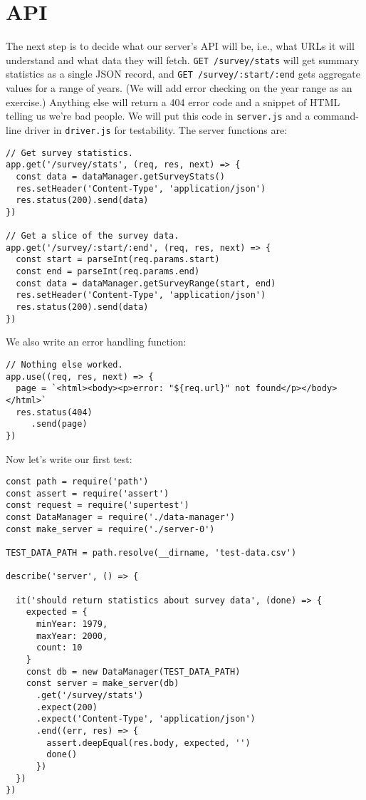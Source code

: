 \section{API}\label{s:capstone-api}

The next step is to decide what our server's API will be,
i.e.,
what URLs it will understand and what data they will fetch.
\texttt{GET\ /survey/stats} will get summary statistics as a single JSON record,
and \texttt{GET\ /survey/:start/:end} gets aggregate values for a range of years.
(We will add error checking on the year range as an exercise.)
Anything else will return a 404 error code and a snippet of HTML telling us we're bad people.
We will put this code in \texttt{server.js} and a command-line driver in \texttt{driver.js} for testability.
The server functions are:

\begin{verbatim}
// Get survey statistics.
app.get('/survey/stats', (req, res, next) => {
  const data = dataManager.getSurveyStats()
  res.setHeader('Content-Type', 'application/json')
  res.status(200).send(data)
})

// Get a slice of the survey data.
app.get('/survey/:start/:end', (req, res, next) => {
  const start = parseInt(req.params.start)
  const end = parseInt(req.params.end)
  const data = dataManager.getSurveyRange(start, end)
  res.setHeader('Content-Type', 'application/json')
  res.status(200).send(data)
})
\end{verbatim}

\noindent
We also write an error handling function:

\begin{verbatim}
// Nothing else worked.
app.use((req, res, next) => {
  page = `<html><body><p>error: "${req.url}" not found</p></body></html>`
  res.status(404)
     .send(page)
})
\end{verbatim}

Now let's write our first test:

\begin{verbatim}
const path = require('path')
const assert = require('assert')
const request = require('supertest')
const DataManager = require('./data-manager')
const make_server = require('./server-0')

TEST_DATA_PATH = path.resolve(__dirname, 'test-data.csv')

describe('server', () => {

  it('should return statistics about survey data', (done) => {
    expected = {
      minYear: 1979,
      maxYear: 2000,
      count: 10
    }
    const db = new DataManager(TEST_DATA_PATH)
    const server = make_server(db)
      .get('/survey/stats')
      .expect(200)
      .expect('Content-Type', 'application/json')
      .end((err, res) => {
        assert.deepEqual(res.body, expected, '')
        done()
      })
  })
})
\end{verbatim}


